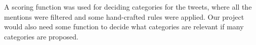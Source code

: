 A scoring function was used for deciding categories for the tweets, where all the mentions were filtered and some hand-crafted rules were applied. Our project would also need some function to decide what categories are relevant if many categories are proposed. 

